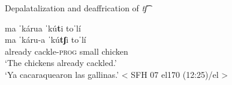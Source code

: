 \ea\label{ex: depalatalization and deaffrication of ch 2}
{Depalatalization and deaffrication of \textit{tʃ͡}}

    ma     ˈkárua     ˈkú\textbf{t}i   toˈlí\\
    \gll    ma    ˈkáru-a    ˈkú\textbf{tʃ}i  toˈlí\\
            already cackle-\textsc{prog}  small  chicken  \\
    \glt    ‘The chickens already cackled.’\\
    \glt    ‘Ya cacaraquearon las gallinas.’   < SFH 07 el170 (12:25)/el >
\z




